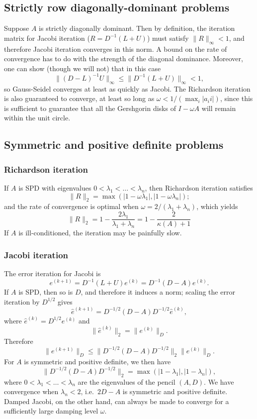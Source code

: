 \documentclass[12pt, leqno]{article} %
\begin{document}
\subsection{Strictly row diagonally-dominant problems}

Suppose $A$ is strictly diagonally dominant.  Then by definition,
the iteration matrix for Jacobi iteration ($R = D^{-1} (L+U)$)
must satisfy $\|R\|_\infty < 1$, and therefore Jacobi iteration
converges in this norm.  A bound on the rate of convergence has
to do with the strength of the diagonal dominance.  Moreover,
one can show (though we will not) that in this case
\[
  \|(D-L)^{-1} U\|_\infty \leq \|D^{-1}(L+U)\|_\infty < 1,
\]
so Gauss-Seidel converges at least as quickly as Jacobi.  The
Richardson iteration is also guaranteed to converge, at least so
long as $\omega < 1/(\max_i |a_ii|)$, since this is sufficient to
guarantee that all the Gershgorin disks of $I-\omega A$ will
remain within the unit circle.

\subsection{Symmetric and positive definite problems}

\subsubsection{Richardson iteration}

If $A$ is SPD with eigenvalues
$0 < \lambda_1 < \ldots < \lambda_n$, then Richardson
iteration satisfies
\[
  \|R\|_2 = \max(|1-\omega \lambda_1|, |1-\omega \lambda_n|);
\]
and the rate of convergence is optimal when
$\omega = 2/(\lambda_1 + \lambda_n)$,
which yields
\[
  \|R\|_2
    = 1 - \frac{2 \lambda_1}{\lambda_1 + \lambda_n}
    = 1 - \frac{2}{\kappa(A) + 1}
\]
If $A$ is ill-conditioned, the iteration may be painfully slow.

\subsubsection{Jacobi iteration}

The error iteration for Jacobi is
\[
  e^{(k+1)} = D^{-1} (L+U) e^{(k)} = D^{-1} (D-A) e^{(k)}.
\]
If $A$ is SPD, then so is $D$, and therefore it induces a norm;
scaling the error iteration by $D^{1/2}$ gives
\[
  \hat{e}^{(k+1)} = D^{-1/2} (D-A) D^{-1/2} \hat{e}^{(k)},
\]
where $\hat{e}^{(k)} = D^{1/2} e^{(k)}$ and
\[
  \|\hat{e}^{(k)}\|_2 = \|e^{(k)}\|_D.
\]
Therefore
\[
  \|e^{(k+1)}\|_D \leq \|D^{-1/2} (D-A) D^{-1/2}\|_2 \|e^{(k)}\|_D.
\]
For $A$ is symmetric and positive definite, we then have
\[
  \| D^{-1/2} (D-A) D^{-1/2} \|_2 = \max(|1-\lambda_1|, |1-\lambda_n|),
\]
where $0 < \lambda_1 < \ldots < \lambda_n$ are the eigenvalues of the
pencil $(A,D)$.  We have convergence when $\lambda_n < 2$,
i.e.~$2D-A$ is symmetric and positive definite.  Damped Jacobi, on
the other hand, can always be made to converge for a sufficiently
large damping level $\omega$.
\end{document}
